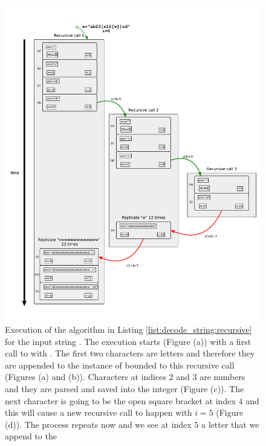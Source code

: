 \begin{figure}
	
	\vspace{-3.5cm}

	\captionsetup{font=footnotesize,labelfont=footnotesize}
	\centering
	\hspace*{-1.5cm}
	\includegraphics[width=1.25\textwidth]{sources/decode_string/images/recursion}
	\vspace*{-10mm}
   \caption{Execution of the algorithm in Listing \ref{list:decode_string:recursive} for the input
	string . The execution starts (Figure (a)) with a first call to
	 with . The first two characters are letters
	and therefore they are appended to the instance of  bounded to this recursive call
	(Figures (a) and (b)). Characters at indices $2$ and $3$ are numbers and they are parsed and
	saved into the integer  (Figure (c)). The next character is going to be the open
	square bracket at index $4$  and this will cause a new recursive call to happen with $i=5$
	(Figure (d)). The process repeats now and we see at index $5$ a letter that we append to the
}
\end{figure}
